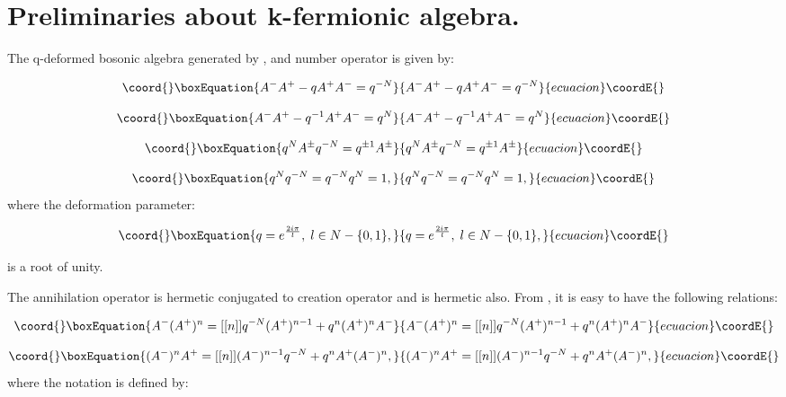\documentclass[a4paper,12pt,thmsa]{article}
\begin{document}
\section{Preliminaries about k-fermionic algebra.}

The q-deformed bosonic algebra \coordHE{} generated by \coordHE{}, \coordHE{} and
number operator \coordHE{} is given by:

\begin{equation}\coord{}\boxEquation{
A^{-}A^{+}-qA^{+}A^{-}=q^{-N}
}{
A^{-}A^{+}-qA^{+}A^{-}=q^{-N}
}{ecuacion}\coordE{}\end{equation}

\begin{equation}\coord{}\boxEquation{
A^{-}A^{+}-q^{-1}A^{+}A^{-}=q^N
}{
A^{-}A^{+}-q^{-1}A^{+}A^{-}=q^N
}{ecuacion}\coordE{}\end{equation}

\begin{equation}\coord{}\boxEquation{
q^NA^{\pm }q^{-N}=q^{\pm 1}A^{\pm }
}{
q^NA^{\pm }q^{-N}=q^{\pm 1}A^{\pm }
}{ecuacion}\coordE{}\end{equation}

\begin{equation}\coord{}\boxEquation{
q^Nq^{-N}=q^{-N}q^N=1,
}{
q^Nq^{-N}=q^{-N}q^N=1,
}{ecuacion}\coordE{}\end{equation}
where the deformation parameter:

\begin{equation}\coord{}\boxEquation{
q=e^{\frac{2i\pi }l},\; l\in N-\{0,1\},
}{
q=e^{\frac{2i\pi }l},\; l\in N-\{0,1\},
}{ecuacion}\coordE{}\end{equation}

is a root of unity.

The annihilation operator \coordHE{} is hermetic conjugated to creation
operator \coordHE{} and \coordHE{} is hermetic also. From \myHighlight{$\left[ 1-4\right] $}\coordHE{}, it is
easy to have the following relations:

\begin{equation}\coord{}\boxEquation{
A^{-}(A^{+})^n=[[n]]q^{-N}(A^{+})^{n-1}+q^n(A^{+})^nA^{-}
}{
A^{-}(A^{+})^n=[[n]]q^{-N}(A^{+})^{n-1}+q^n(A^{+})^nA^{-}
}{ecuacion}\coordE{}\end{equation}

\begin{equation}\coord{}\boxEquation{
(A^{-})^nA^{+}=[[n]](A^{-})^{n-1}q^{-N}+q^nA^{+}(A^{-})^n,
}{
(A^{-})^nA^{+}=[[n]](A^{-})^{n-1}q^{-N}+q^nA^{+}(A^{-})^n,
}{ecuacion}\coordE{}\end{equation}
where the notation \myHighlight{$[[$}\coordHE{}  \myHighlight{$]]$}\coordHE{} is defined by:
\end{document}
